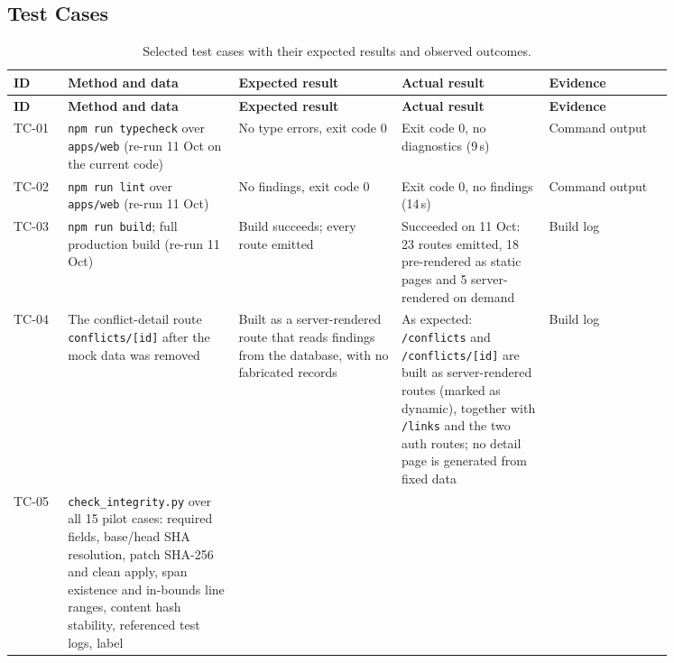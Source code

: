 \begin{landscape}
\section{Test Cases}
\label{sec:test-cases}

\begin{longtable}{>{\raggedright\arraybackslash}p{0.07\linewidth} >{\raggedright\arraybackslash}p{0.22\linewidth} >{\raggedright\arraybackslash}p{0.21\linewidth} >{\raggedright\arraybackslash}p{0.19\linewidth} >{\raggedright\arraybackslash}p{0.16\linewidth}}
\caption{Selected test cases with their expected results and observed outcomes.}\label{tab:test-cases}\\
\hline\textbf{ID} & \textbf{Method and data} & \textbf{Expected result} &
  \textbf{Actual result} & \textbf{Evidence} \\
\hline\endfirsthead
\hline\textbf{ID} & \textbf{Method and data} & \textbf{Expected result} &
  \textbf{Actual result} & \textbf{Evidence} \\
\hline\endhead
TC-01 & \texttt{npm run typecheck} over \texttt{apps/web} (re-run 11 Oct on
  the current code) & No type errors, exit code 0 & Exit code 0, no
  diagnostics (9\,s) & Command output \\
TC-02 & \texttt{npm run lint} over \texttt{apps/web} (re-run 11 Oct) & No
  findings, exit code 0 & Exit code 0, no findings (14\,s) & Command output \\
TC-03 & \texttt{npm run build}; full production build (re-run 11 Oct) & Build
  succeeds; every route emitted & Succeeded on 11 Oct: 23 routes emitted, 18 pre-rendered as static pages and 5 server-rendered on demand & Build log \\
TC-04 & The conflict-detail route \texttt{conflicts/[id]} after the mock data
  was removed & Built as a server-rendered route that reads findings from the
  database, with no fabricated records & As expected: \texttt{/conflicts} and \texttt{/conflicts/[id]} are built as server-rendered routes (marked as dynamic), together with \texttt{/links} and the two auth routes; no detail page is generated from fixed data & Build log \\
TC-05 & \texttt{check\_\allowbreak{}integrity.\allowbreak{}py} over all 15 pilot cases: required fields,
  base/head SHA resolution, patch SHA-256 and clean apply, span existence and
  in-bounds line ranges, content hash stability, referenced test logs, label

\end{longtable}
\end{landscape}
